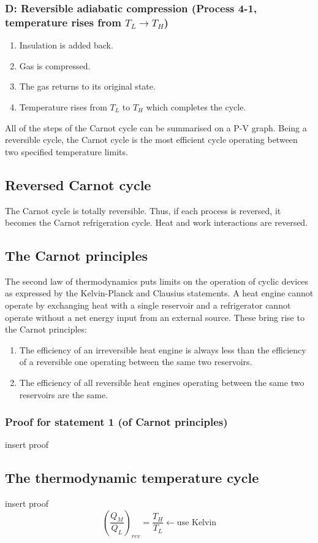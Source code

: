 \documentclass[class=report, crop=false, 12pt,a4paper]{standalone}
\begin{document}
\subsubsection{D: Reversible adiabatic compression (Process 4-1, temperature rises from $T_L \rightarrow T_H$)}
\begin{enumerate}[noitemsep]
  \item Insulation is added back.
  \item Gas is compressed.
  \item The gas returns to its original state.
  \item Temperature rises from $T_L$ to $T_H$ which completes the cycle.
\end{enumerate}
All of the steps of the Carnot cycle can be summarised on a P-V graph. Being a reversible cycle, the Carnot cycle is the most efficient cycle operating between two specified temperature limits.
\subsection{Reversed Carnot cycle}
The Carnot cycle is totally reversible. Thus, if each process is reversed, it becomes the Carnot refrigeration cycle. Heat and work interactions are reversed. 
\subsection{The Carnot principles}
The second law of thermodynamics puts limits on the operation of cyclic devices as expressed by the Kelvin-Planck and Clausius statements. A heat engine cannot operate by exchanging heat with a single reservoir and a refrigerator cannot operate without a net energy input from an external source. These bring rise to the Carnot principles:
\begin{enumerate}[noitemsep]
  \item The efficiency of an irreversible heat engine is always less than the efficiency of a reversible one operating between the same two reservoirs.
  \item The efficiency of all reversible heat engines operating between the same two reservoirs are the same.
\end{enumerate}
\subsubsection{Proof for statement 1 (of Carnot principles)}
insert proof
\subsection{The thermodynamic temperature cycle}
insert proof
\[ \left( \frac{Q_M}{Q_L} \right)_{rev} = \frac{T_H}{T_L} \leftarrow \textrm{use Kelvin} \]
\end{document}
